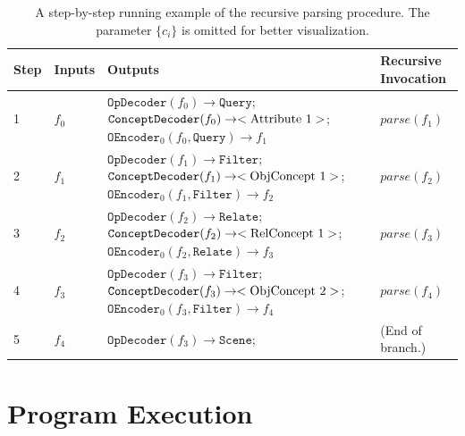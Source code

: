 \documentclass{article} %
\begin{document}
\begin{table}[th]
    \centering
    \begin{tabular}{llp{}l}
    \toprule
        Step & Inputs & Outputs & Recursive Invocation \\ \midrule
        1 & $f_0$ &
        $\texttt{OpDecoder}(f_0) \rightarrow \texttt{Query}$;\newline
        $\texttt{ConceptDecoder}(f_0) \rightarrow <\textnormal{Attribute 1}>$;\newline
        $\texttt{OEncoder}_0(f_0, \texttt{Query}) \rightarrow f_1$
        &$parse(f_1)$\\ \midrule
        2 & $f_1$ &
        $\texttt{OpDecoder}(f_1) \rightarrow \texttt{Filter}$;\newline
        $\texttt{ConceptDecoder}(f_1) \rightarrow <\textnormal{ObjConcept 1}>$;\newline
        $\texttt{OEncoder}_0(f_1, \texttt{Filter}) \rightarrow f_2$
        &$parse(f_2)$\\ \midrule
        3 & $f_2$ &
        $\texttt{OpDecoder}(f_2) \rightarrow \texttt{Relate}$;\newline
        $\texttt{ConceptDecoder}(f_2) \rightarrow <\textnormal{RelConcept 1}>$;\newline
        $\texttt{OEncoder}_0(f_2, \texttt{Relate}) \rightarrow f_3$
        &$parse(f_3)$\\ \midrule
        4 & $f_3$ &
        $\texttt{OpDecoder}(f_3) \rightarrow \texttt{Filter}$;\newline
        $\texttt{ConceptDecoder}(f_3) \rightarrow <\textnormal{ObjConcept 2}>$;\newline
        $\texttt{OEncoder}_0(f_3, \texttt{Filter}) \rightarrow f_4$
        &$parse(f_4)$\\ \midrule
        5 & $f_4$ &
        $\texttt{OpDecoder}(f_3) \rightarrow \texttt{Scene}$;
        & (End of branch.)\\ \bottomrule
    \end{tabular}
    \caption{A step-by-step running example of the recursive parsing procedure. The parameter $\{c_i\}$ is omitted for better visualization.}
    \label{tab:parse-example}
\end{table}

\section{Program Execution}
\label{sec:app:execution}
\end{document}
